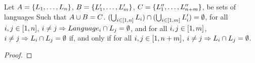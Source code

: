 \documentclass[numbers]{sigplanconf}
\begin{document}
\begin{lemma}
  \label{lem:unambig-union-equiv}
  Let $A = \{L_1,\ldots,L_n\}$,
  $B = \{L_1',\ldots,L_m'\}$,
  $C = \{L_1'',\ldots,L_{n+m}''\}$, be sets of languages
  Such that $A \cup B = C$.
  $(\bigcup_{i\in[1,n]}L_i) \cap
  (\bigcup_{i\in[1,m]}L_i') = \emptyset$,
  for all $i,j\in[1,n]$, $i \neq j \Rightarrow Language_i \cap
  L_j = \emptyset$, and for all $i,j\in[1,m]$, $i \neq j
  \Rightarrow L_i \cap L_j = \emptyset$ if, and only
  if for all $i,j\in[1,n+m]$, $i \neq j \Rightarrow L_i
  \cap L_j = \emptyset$.
\end{lemma}
\begin{proof}
\end{proof}
\end{document}
